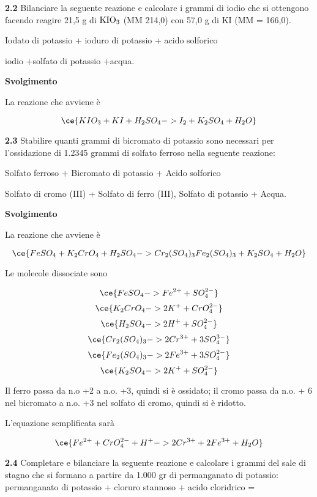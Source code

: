 \vspace{0.2cm}\textbf{2.2} Bilanciare la  seguente reazione e calcolare i grammi di iodio che si ottengono facendo reagire 21,5 g di $\rm KIO_3$ (MM 214,0) con 57,0 g di KI (MM = 166,0).

\vspace{0.2cm}
\begin{center}Iodato di potassio + ioduro di potassio + acido solforico \ce{->}

\ce{->}iodio +solfato di potassio +acqua. 
\end{center}

\large\textbf{Svolgimento}\normalsize

\vspace{0.2cm}La reazione che avviene è

$$\ce{KIO_3 + KI + H_2SO_4 -> I_2 + K_2SO_4 + H_2O}$$

\vspace{0.2cm}\textbf{2.3} Stabilire quanti grammi di bicromato di potassio sono necessari per l’ossidazione di 1.2345 grammi di solfato ferroso nella seguente reazione:

\begin{center}
    Solfato ferroso + Bicromato di potassio + Acido solforico \ce{->}
    
    \ce{->} Solfato di cromo (III) + Solfato di ferro (III), Solfato di potassio + Acqua.   
\end{center}

\large\textbf{Svolgimento}\normalsize

\vspace{0.2cm}La reazione che avviene è

$$\ce{FeSO_4 + K_2CrO_4 + H_2SO_4 -> Cr_2(SO_4)_3 Fe_2(SO_4)_3 + K_2SO_4 + H_2O}$$

Le molecole dissociate sono

$$\ce{FeSO_4 -> Fe^{2+} + SO_4^{2-}}$$
$$\ce{K_2CrO_4 -> 2K^+ + CrO_4^{2-}}$$
$$\ce{H_2SO_4 -> 2H^+ + SO_4^{2-}}$$
$$\ce{Cr_2(SO_4)_3 -> 2Cr^{3+} + 3SO_4^{3-}}$$
$$\ce{Fe_2(SO_4)_3 -> 2Fe^{3+} + 3SO_4^{2-}}$$
$$\ce{K_2SO_4 -> 2K^+ + SO_4^{2-}}$$

Il ferro passa da n.o +2 a n.o. +3, quindi si è ossidato; il cromo passa da n.o. + 6 nel bicromato a n.o. +3 nel solfato di cromo, quindi si è ridotto.

L'equazione semplificata sarà

$$\ce{Fe^{2+} + CrO_4^{2-} + H^+ -> 2Cr^{3+} + 2Fe^{3+} + H_2O}$$

\vspace{0.2cm}\textbf{2.4} Completare e bilanciare la seguente reazione e calcolare i grammi del sale di stagno che si formano a partire da 1.000 gr di permanganato di potassio: 
permanganato di potassio + cloruro stannoso + acido cloridrico =

